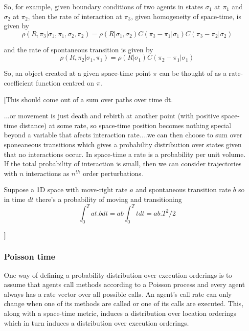 \documentclass[a4paper]{article}
\begin{document}
So, for example, given boundary conditions of two agents in states $\sigma_1$ at $\pi_1$ and $\sigma_2$ at $\pi_2$, then the rate of interaction at $\pi_3$, given homogeneity of space-time, is given by
\[
\rho(R, \pi_3 | \sigma_1, \pi_1, \sigma_2, \pi_2) = \rho(R | \sigma_1, \sigma_2)C(\pi_3 - \pi_1 | \sigma_1)C(\pi_3 - \pi_2 | \sigma_2)
\]

and the rate of spontaneous transition is given by
\[
\rho(R, \pi_2 | \sigma_1, \pi_1) = \rho(R | \sigma_1)C(\pi_2 - \pi_1 | \sigma_1)
\]

So, an object created at a given space-time point $\pi$ can be thought of as a rate-coefficient function centred on $\pi$. 

[This should come out of a sum over paths over time dt.

...or movement is just death and rebirth at another point (with positive space-time distance) at some rate, so space-time position becomes nothing special beyond a variable that afects interaction rate....we can then choose to sum over sponeaneous transitions which gives a probability distribution over states given that no interactions occur. In space-time a rate is a probability per unit volume. If the total probability of interaction is small, then we can consider trajectories with $n$ interactions as $n^{th}$ order perturbations.

Suppose a 1D space with move-right rate $a$ and spontaneous transition rate $b$ so in time $dt$ there's a probability of moving and transitioning
\[
\int_0^T a t. b dt = ab \int_0^T t dt = ab. T^2/2
\]

]

\subsubsection{Poisson time}

One way of defining a probability distribution over execution orderings is to assume that agents call methods according to a Poisson process and every agent always has a rate vector over all possible calls. An agent's call rate can only change when one of its methods are called or one of its calls are executed. This, along with a space-time metric, induces a distribution over location orderings which in turn induces a distribution over execution orderings.
\end{document}
